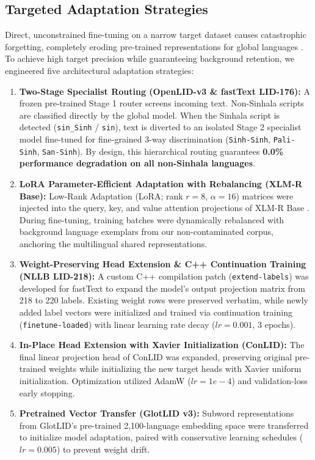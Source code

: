 \documentclass[11pt]{article}
\begin{document}
\subsection{Targeted Adaptation Strategies}
Direct, unconstrained fine-tuning on a narrow target dataset causes catastrophic forgetting, completely eroding pre-trained representations for global languages \cite{mccloskey1989catastrophic,french1999catastrophic,kirkpatrick2017overcoming}. To achieve high target precision while guaranteeing background retention, we engineered five architectural adaptation strategies:
\begin{enumerate}
    \item \textbf{Two-Stage Specialist Routing (OpenLID-v3 \& fastText LID-176):} A frozen pre-trained Stage 1 router screens incoming text. Non-Sinhala scripts are classified directly by the global model. When the Sinhala script is detected (\texttt{sin\_Sinh} / \texttt{sin}), text is diverted to an isolated Stage 2 specialist model fine-tuned for fine-grained 3-way discrimination (\texttt{Sinh-Sinh}, \texttt{Pali-Sinh}, \texttt{San-Sinh}). By design, this hierarchical routing guarantees \textbf{0.0\% performance degradation on all non-Sinhala languages}.
    \item \textbf{LoRA Parameter-Efficient Adaptation with Rebalancing (XLM-R Base):} Low-Rank Adaptation (LoRA; rank $r=8$, $\alpha=16$) matrices were injected into the query, key, and value attention projections of XLM-R Base \cite{hu2022lora}. During fine-tuning, training batches were dynamically rebalanced with background language exemplars from our non-contaminated corpus, anchoring the multilingual shared representations.
    \item \textbf{Weight-Preserving Head Extension \& C++ Continuation Training (NLLB LID-218):} A custom C++ compilation patch (\texttt{extend-labels}) was developed for fastText to expand the model's output projection matrix from 218 to 220 labels. Existing weight rows were preserved verbatim, while newly added label vectors were initialized and trained via continuation training (\texttt{finetune-loaded}) with linear learning rate decay ($lr=0.001$, 3 epochs).
    \item \textbf{In-Place Head Extension with Xavier Initialization (ConLID):} The final linear projection head of ConLID was expanded, preserving original pre-trained weights while initializing the new target heads with Xavier uniform initialization. Optimization utilized AdamW ($lr=1e-4$) and validation-loss early stopping.
    \item \textbf{Pretrained Vector Transfer (GlotLID v3):} Subword representations from GlotLID's pre-trained 2,100-language embedding space were transferred to initialize model adaptation, paired with conservative learning schedules ($lr=0.005$) to prevent weight drift.
\end{enumerate}
\end{document}
